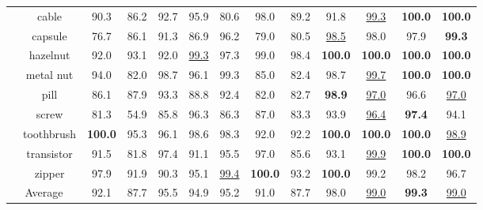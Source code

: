 \documentclass[default,iicol]{sn-jnl}\usepackage[algo2e,ruled,linesnumbered]{algorithm2e}
\theoremstyle{thmstyleone}\newtheorem{theorem}{Theorem}\newtheorem{proposition}[theorem]{Proposition}
\theoremstyle{thmstyletwo}\newtheorem{example}{Example}\newtheorem{remark}{Remark}
\theoremstyle{thmstylethree}\newtheorem{definition}{Definition}
\begin{document}
\begin{table*}[!t]
\begin{tabular}{c|c|ccccccccc|cc}
    &cable                                           
        &90.3  &86.2      &92.7      &95.9      &80.6      &98.0      &89.2      &91.8      &\underline{99.3}      &\textbf{100.0} &\textbf{100.0}   \\
    &capsule                                                         
        &76.7  &86.1      &91.3      &86.9      &96.2      &79.0      &80.5      &\underline{98.5}      &98.0      &97.9 &\textbf{99.3}   \\
    &hazelnut                                                         
        &92.0  &93.1      &92.0      &\underline{99.3}      &97.3      &99.0      &98.4      &\textbf{100.0}     &\textbf{100.0}     &\textbf{100.0} &\textbf{100.0}   \\
    &metal nut                                                       
        &94.0  &82.0      &98.7      &96.1      &99.3      &85.0      &82.4      &98.7      &\underline{99.7}      &\textbf{100.0} &\textbf{100.0}   \\
    &pill                                                            
        &86.1  &87.9      &93.3      &88.8      &92.4      &82.0      &82.7      &\textbf{98.9}      &\underline{97.0}      &96.6 &\underline{97.0}   \\
    &screw                                                           
        &81.3  &54.9      &85.8      &96.3     &86.3      &87.0      &83.3      &93.9      &\underline{96.4}      &\textbf{97.4} &94.1   \\
    &toothbrush                                                      
        &\textbf{100.0} &95.3      &96.1      &98.6      &98.3      &92.0      &92.2      &\textbf{100.0}     &\textbf{100.0}     &\textbf{100.0} &\underline{98.9}   \\
    &transistor                                                      
        &91.5  &81.8      &97.4      &91.1      &95.5      &97.0      &85.6      &93.1      &\underline{99.9}      &\textbf{100.0} &\textbf{100.0}   \\
    &zipper                                                         
        &97.9  &91.9      &90.3      &95.1      &\underline{99.4}      &\textbf{100.0}     &93.2      &\textbf{100.0}     &99.2      &98.2 &96.7   \\\hline 
    \multicolumn{2}{c|}{Average}                       
        &92.1  &87.7      &95.5      &94.9      &95.2      &91.0      &87.7      &98.0      &\underline{99.0}      &\textbf{99.3} &\underline{99.0}\\\hline
    \end{tabular}
    \label{table:IAD}
\end{table*}
\end{document}
